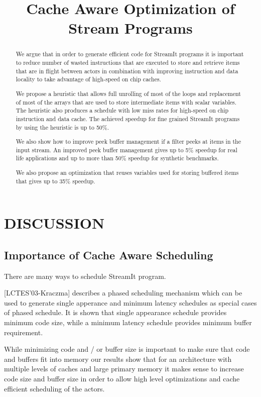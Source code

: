 \documentclass{sig-alternate}
\title{Cache Aware Optimization of Stream Programs}
\author{}
\begin{document}
\maketitle

\begin{abstract}

We argue that in order to generate efficient 
code for StreamIt programs it is important to reduce number 
of wasted instructions that are executed to store and retrieve 
items that are in flight between actors in combination with 
improving instruction and data locality to take advantage of 
high-speed on chip caches.

We propose a heuristic that allows full unrolling of
most of the loops and replacement of most of the arrays that are
used to store intermediate items with scalar variables.
The heuristic also produces a schedule with low miss rates for 
high-speed on chip instruction and data cache. The achieved 
speedup for fine grained StreamIt programs by using the 
heuristic is up to 50\%.

We also show how to improve peek buffer management if a filter 
peeks at items in the input stream. An improved peek buffer 
management gives up to 5\% speedup for real life applications 
and up to more than 50\% speedup for synthetic benchmarks.

We also propose an optimization that reuses variables used for 
storing buffered items that gives up to 35\% speedup. 

\end{abstract}

\section{DISCUSSION}

\subsection{Importance of Cache Aware Scheduling}

There are many ways to schedule StreamIt program.

[LCTES'03-Kraczma] describes a phased scheduling mechanism
which can be used to generate single apperance and
minimum latency schedules as special cases of phased schedule.
It is shown that single appearance schedule provides
minimum code size, while a minimum latency schedule provides
minimum buffer requirement.

While minimizing code and / or buffer size is important to make
sure that code and buffers fit into memory our results show that
for an architecture with multiple levels of caches and
large primary memory it makes sense to increase code
size and buffer size in order to allow high level optimizations
and cache efficient scheduling of the actors.
\end{document}
